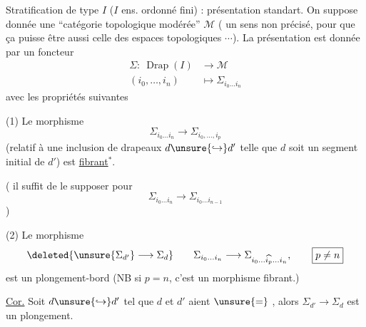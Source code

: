 
Stratification 
de type \(I\) (\(I\) ens. ordonné fini) : présentation standart.
On suppose donnée une ``catégorie topologique modérée'' \(\mathcal M\)
( un sens non précisé, pour que ça puisse être aussi celle des
espaces topologiques \(\cdots\)). La présentation est donnée
par un  foncteur
\[
 \begin{aligned}
 \Sigma:\ \operatorname{Drap}(I)&\longrightarrow\mathcal M\\
 (i_0,\ldots,i_n)&\longmapsto\Sigma_{i_0\ldots i_n}
 \end{aligned}
\]
avec les propriétés suivantes

(1) Le  morphisme
\[
 \Sigma_{i_0\ldots i_n}\longrightarrow\Sigma_{i_0,\ldots,i_p}
\]
(relatif à une inclusion de drapeaux
\(d\unsure{\hookrightarrow}d'\) telle
que \(d\) soit un segment initial de \(d'\)) est \uline{fibrant}\(^*\).



 ( il suffit de le supposer pour
\[
 \Sigma_{i_0\ldots i_n}\longrightarrow\Sigma_{i_0\ldots i_{n-1}}
\]
)

(2) Le morphisme
\[
 \deleted{\unsure{\Sigma_{d'}}\longrightarrow\Sigma_d}
 \qquad
 \Sigma_{i_0\ldots i_n}
 \longrightarrow
 \Sigma_{i_0\ldots\widehat{i_p}\ldots i_n},
 \qquad \boxed{p\ne n}
\]
est un plongement-bord
(NB si \(p=n\), c'est un morphisme fibrant.)


\uline{Cor.} Soit \(d\unsure{\hookrightarrow}d'\)
tel que \(d\) et \(d'\) aient \(\unsure{=}\)
, alors
\(\Sigma_{d'}\longrightarrow\Sigma_d\) est un plongement.


